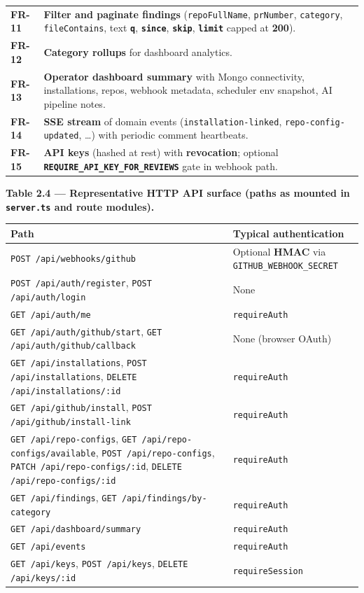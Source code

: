\documentclass[11pt,a4paper]{report}
\begin{document}
\begin{tabular}{@{}p{}p{}@{}}
\textbf{FR-11} & \textbf{Filter and paginate findings} (\texttt{repoFullName}, \texttt{prNumber}, \texttt{category}, \texttt{fileContains}, text \textbf{\texttt{q}}, \textbf{\texttt{since}}, \textbf{\texttt{skip}}, \textbf{\texttt{limit}} capped at \textbf{200}). \\
\textbf{FR-12} & \textbf{Category rollups} for dashboard analytics. \\
\textbf{FR-13} & \textbf{Operator dashboard summary} with Mongo connectivity, installations, repos, webhook metadata, scheduler env snapshot, AI pipeline notes. \\
\textbf{FR-14} & \textbf{SSE stream} of domain events (\texttt{installation-linked}, \texttt{repo-config-updated}, …) with periodic comment heartbeats. \\
\textbf{FR-15} & \textbf{API keys} (hashed at rest) with \textbf{revocation}; optional \textbf{\texttt{REQUIRE\_API\_KEY\_FOR\_REVIEWS}} gate in webhook path. \\
\bottomrule
\end{tabular}
\endgroup


\textbf{Table 2.4 — Representative HTTP API surface (paths as mounted in \texttt{server.ts} and route modules).}


\begingroup\small
\begin{tabular}{@{}p{}p{}@{}}
\toprule
Path & Typical authentication \\
\midrule
\texttt{POST /api/webhooks/github} & Optional \textbf{HMAC} via \texttt{GITHUB\_WEBHOOK\_SECRET} \\
\texttt{POST /api/auth/register}, \texttt{POST /api/auth/login} & None \\
\texttt{GET /api/auth/me} & \texttt{requireAuth} \\
\texttt{GET /api/auth/github/start}, \texttt{GET /api/auth/github/callback} & None (browser OAuth) \\
\texttt{GET /api/installations}, \texttt{POST /api/installations}, \texttt{DELETE /api/installations/:id} & \texttt{requireAuth} \\
\texttt{GET /api/github/install}, \texttt{POST /api/github/install-link} & \texttt{requireAuth} \\
\texttt{GET /api/repo-configs}, \texttt{GET /api/repo-configs/available}, \texttt{POST /api/repo-configs}, \texttt{PATCH /api/repo-configs/:id}, \texttt{DELETE /api/repo-configs/:id} & \texttt{requireAuth} \\
\texttt{GET /api/findings}, \texttt{GET /api/findings/by-category} & \texttt{requireAuth} \\
\texttt{GET /api/dashboard/summary} & \texttt{requireAuth} \\
\texttt{GET /api/events} & \texttt{requireAuth} \\
\texttt{GET /api/keys}, \texttt{POST /api/keys}, \texttt{DELETE /api/keys/:id} & \texttt{requireSession} \\
\bottomrule
\end{tabular}
\endgroup
\end{document}
